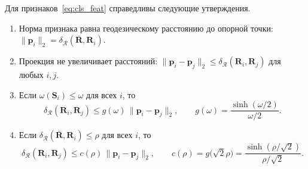 \begin{theorem}\label{thm:cls_isometry}
Для признаков~\eqref{eq:cls_feat} справедливы следующие утверждения.
\begin{enumerate}
    \item[(а)] Норма признака равна геодезическому расстоянию до опорной точки: $\|\mathbf{p}_i\|_2 = \delta_{\mathcal{R}}(\bar{\mathbf{R}}, \mathbf{R}_i)$.
    \item[(б)] Проекция не увеличивает расстояний: $\|\mathbf{p}_i - \mathbf{p}_j\|_2 \leqslant \delta_{\mathcal{R}}(\mathbf{R}_i, \mathbf{R}_j)$ для любых $i, j$.
    \item[(в)] Если $\omega(\mathbf{S}_i) \leqslant \omega$ для всех $i$, то
    \begin{equation}\label{eq:cls_isometry_omega}
    \delta_{\mathcal{R}}(\mathbf{R}_i, \mathbf{R}_j) \leqslant g(\omega)\, \|\mathbf{p}_i - \mathbf{p}_j\|_2,
    \qquad
    g(\omega) = \frac{\sinh(\omega/2)}{\omega/2} .
    \end{equation}
    \item[(г)] Если $\delta_{\mathcal{R}}(\bar{\mathbf{R}}, \mathbf{R}_i) \leqslant \rho$ для всех $i$, то
    \begin{equation}\label{eq:cls_isometry}
    \delta_{\mathcal{R}}(\mathbf{R}_i, \mathbf{R}_j) \leqslant c(\rho)\, \|\mathbf{p}_i - \mathbf{p}_j\|_2,
    \qquad
    c(\rho) = g\big(\sqrt{2}\rho\big) = \frac{\sinh(\rho/\sqrt{2})}{\rho/\sqrt{2}} .
    \end{equation}
\end{enumerate}
\end{theorem}
